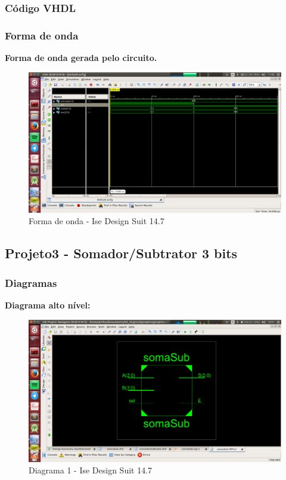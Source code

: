 \documentclass[12pts]{article}
\begin{document}
\newpage
\subsubsection{Código VHDL}



\newpage
\subsubsection{Forma de onda}

\textbf{Forma de onda gerada pelo circuito.}

\begin{figure}[!htb]
  \centering
  \includegraphics[scale=0.3	]{imagens/complemento1}
  \caption{Forma de onda - Ise Design Suit 14.7}
  \label{figRotulo}
\end{figure}

\newpage
\subsection{Projeto3 - Somador/Subtrator 3 bits}
\subsubsection{Diagramas}

\textbf{Diagrama alto nível:}

\begin{figure}[!htb]
  \centering
  \includegraphics[scale=0.3	]{imagens/somaSub1}
  \caption{Diagrama 1 - Ise Design Suit 14.7}
  \label{figRotulo}
\end{figure}
\end{document}
